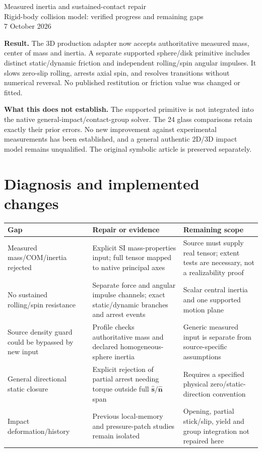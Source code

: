 \documentclass[10pt,a4paper]{article}
\begin{document}
\begin{center}
{\Large Measured inertia and sustained-contact repair}\\[5pt]
{\large Rigid-body collision model: verified progress and remaining gaps}\\
7 October 2026
\end{center}

\textbf{Result.} The 3D production adapter now accepts authoritative measured mass,
center of mass and inertia. A separate supported sphere/disk primitive includes
distinct static/dynamic friction and independent rolling/spin angular impulses.
It slows zero-slip rolling, arrests axial spin, and resolves transitions without
numerical reversal. No published restitution or friction value was changed or fitted.

\textbf{What this does not establish.} The supported primitive is not integrated
into the native general-impact/contact-group solver. The 24 glass comparisons
retain exactly their prior errors. No new improvement against experimental
measurements has been established, and a general authentic 2D/3D impact model
remains unqualified. The original symbolic article is preserved separately.

\section*{Diagnosis and implemented changes}
\begin{tabular}{p{.26\linewidth}p{.32\linewidth}p{.34\linewidth}}
\hline
Gap & Repair or evidence & Remaining scope\\\hline
Measured mass/COM/inertia rejected & Explicit SI mass-properties input; full tensor mapped to native principal axes & Source must supply real tensor; extent tests are necessary, not a realizability proof\\
No sustained rolling/spin resistance & Separate force and angular impulse channels; exact static/dynamic branches and arrest events & Scalar central inertia and one supported motion plane\\
Source density guard could be bypassed by new input & Profile checks authoritative mass and declared homogeneous-sphere inertia & Generic measured input is separate from source-specific assumptions\\
General directional static closure & Explicit rejection of partial arrest needing torque outside full $\hat{\boldsymbol s}/\hat{\boldsymbol n}$ span & Requires a specified physical zero/static-direction convention\\
Impact deformation/history & Previous local-memory and pressure-patch studies remain isolated & Opening, partial stick/slip, yield and group integration not repaired here\\\hline
\end{tabular}
\end{document}

